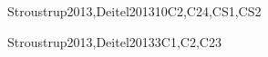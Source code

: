 \begin{syllabus}
\begin{unit}{\PLObjectOrientedProgramming}{}{Stroustrup2013,Deitel2013}{10}{C2,C24,CS1,CS2}
\begin{topics}
    \end{topics}
    \begin{learningoutcomes}
        \item \PLObjectOrientedProgrammingLODesignAndClass [\Usage]
        \item \PLObjectOrientedProgrammingLOUseSubclassing [\Usage]
        \item \PLObjectOrientedProgrammingLOCorrectly [\Usage]
        \item \PLObjectOrientedProgrammingLOCompareAndThe [\Assessment]
        \item \PLObjectOrientedProgrammingLOExplainTheObject [\Familiarity]
        \item \PLObjectOrientedProgrammingLOUseObject [\Usage]
        \item \PLObjectOrientedProgrammingLODefineAndAnd [\Usage]

    \end{learningoutcomes}
\end{unit}

\begin{unit}{\SDFAlgorithmsandDesign}{}{Stroustrup2013,Deitel2013}{3}{C1,C2,C23}
    \begin{topics}
        \item \SDFAlgorithmsandDesignTopicProblem
        \item \SDFAlgorithmsandDesignTopicTheRole
        \item \SDFAlgorithmsandDesignTopicProblem
        \item \SDFAlgorithmsandDesignTopicFundamental
    \end{topics}
    \begin{learningoutcomes}
        \item \SDFAlgorithmsandDesignLODiscussTheAlgorithms [\Familiarity]
        \item \SDFAlgorithmsandDesignLODiscussHowMay [\Familiarity] 
        \item \SDFAlgorithmsandDesignLOCreateAlgorithms [\Usage] 
        \item \SDFAlgorithmsandDesignLOUseAToAnd [\Usage] 
        \item \SDFAlgorithmsandDesignLOImplementTest [\Usage] 
        \item \SDFAlgorithmsandDesignLODetermineWhetherOr [\Assessment]
        \item \SDFAlgorithmsandDesignLOImplementAConquer [\Usage] 
        \item \SDFAlgorithmsandDesignLOApplyTheDecomposition [\Usage] 
        \item \SDFAlgorithmsandDesignLOIdentifyTheAnd [\Usage] 
        \item \SDFAlgorithmsandDesignLOImplementAData [\Usage] 
        \item \SDFAlgorithmsandDesignLOIdentifyTheAndMultiple [\Assessment]
    \end{learningoutcomes}
\end{unit}


\end{syllabus}
